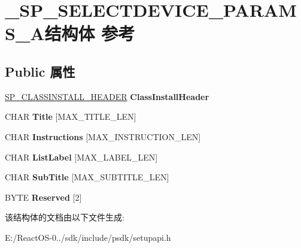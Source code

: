 \hypertarget{struct___s_p___s_e_l_e_c_t_d_e_v_i_c_e___p_a_r_a_m_s___a}{}\section{\+\_\+\+S\+P\+\_\+\+S\+E\+L\+E\+C\+T\+D\+E\+V\+I\+C\+E\+\_\+\+P\+A\+R\+A\+M\+S\+\_\+\+A结构体 参考}
\label{struct___s_p___s_e_l_e_c_t_d_e_v_i_c_e___p_a_r_a_m_s___a}
\subsection*{Public 属性}
\begin{DoxyCompactItemize}
\item 
\mbox{\label{struct___s_p___s_e_l_e_c_t_d_e_v_i_c_e___p_a_r_a_m_s___a_a378e2162f4839921d4cdb0f5e9ee1c36}} 
\hyperlink{struct___s_p___c_l_a_s_s_i_n_s_t_a_l_l___h_e_a_d_e_r}{S\+P\+\_\+\+C\+L\+A\+S\+S\+I\+N\+S\+T\+A\+L\+L\+\_\+\+H\+E\+A\+D\+ER} {\bfseries Class\+Install\+Header}
\item 
\mbox{\label{struct___s_p___s_e_l_e_c_t_d_e_v_i_c_e___p_a_r_a_m_s___a_a86404e56b423c7978dd0b2c3cebff31a}} 
C\+H\+AR {\bfseries Title} \mbox{[}M\+A\+X\+\_\+\+T\+I\+T\+L\+E\+\_\+\+L\+EN\mbox{]}
\item 
\mbox{\label{struct___s_p___s_e_l_e_c_t_d_e_v_i_c_e___p_a_r_a_m_s___a_a5d47295cb6d4eefe5299148e38134cca}} 
C\+H\+AR {\bfseries Instructions} \mbox{[}M\+A\+X\+\_\+\+I\+N\+S\+T\+R\+U\+C\+T\+I\+O\+N\+\_\+\+L\+EN\mbox{]}
\item 
\mbox{\label{struct___s_p___s_e_l_e_c_t_d_e_v_i_c_e___p_a_r_a_m_s___a_a24daaeaf9aa98d23b2a7bd7b823813a0}} 
C\+H\+AR {\bfseries List\+Label} \mbox{[}M\+A\+X\+\_\+\+L\+A\+B\+E\+L\+\_\+\+L\+EN\mbox{]}
\item 
\mbox{\label{struct___s_p___s_e_l_e_c_t_d_e_v_i_c_e___p_a_r_a_m_s___a_a00fea699b987592e341434fdbaa94b0b}} 
C\+H\+AR {\bfseries Sub\+Title} \mbox{[}M\+A\+X\+\_\+\+S\+U\+B\+T\+I\+T\+L\+E\+\_\+\+L\+EN\mbox{]}
\item 
\mbox{\label{struct___s_p___s_e_l_e_c_t_d_e_v_i_c_e___p_a_r_a_m_s___a_af0b8dcaf030fde152f599aa4eef4386d}} 
B\+Y\+TE {\bfseries Reserved} \mbox{[}2\mbox{]}
\end{DoxyCompactItemize}


该结构体的文档由以下文件生成\+:\begin{DoxyCompactItemize}
\item 
E\+:/\+React\+O\+S-\/0../sdk/include/psdk/setupapi.\+h\end{DoxyCompactItemize}
